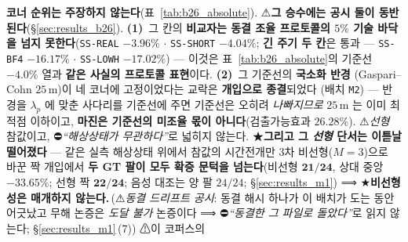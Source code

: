 \documentclass[11pt]{report}
\numberwithin{equation}{chapter}
\numberwithin{figure}{chapter}
\numberwithin{table}{chapter}
\newcommand{\MOneDrift}{\,(⚠\emph{동결 드리프트 공시}: 동결 해시 하나가 이 배치가 도는
동안 어긋났고 무해 논증은 \emph{도달 불가} 논증이다 ⟹ ⛔\emph{``동결한 그 파일로
돌았다''}로 읽지 않는다; \S\ref{sec:results_m1}\,(7))}
\begin{document}
\begin{itemize}
        \textbf{코너 순위는 주장하지 않는다}(표~\ref{tab:b26_absolute}).
        ⚠\textbf{그 승수에는 공시 둘이 동반된다}(\S\ref{sec:results_b26}).
        \textbf{(1)}~그 칸의 \textbf{비교자는 동결 조율 프로토콜의 $5\%$ 기술 바닥을 넘지
        못한다}(\texttt{SS-REAL} $-3.96\%$ $\cdot$ \texttt{SS-SHORT} $-4.04\%$;
        \textbf{긴 주기 두 칸}은 통과 --- \texttt{SS-BF4} $-16.17\%$ $\cdot$
        \texttt{SS-LOWH} $-17.02\%$) --- 이것은 표~\ref{tab:b26_absolute}의 기준선 $-4.0\%$ 열과
        \textbf{같은 사실의 프로토콜 표현}이다. \textbf{(2)}~그 기준선의 \textbf{국소화 반경}
        (Gaspari--Cohn $25$\,m)이 네 코너에 고정이었다는 교락은 \textbf{개입으로 종결}되었다
        (배치 \texttt{M2}) --- 반경을 $\lambda_p$ 에 맞춘 사다리를 기준선에 주면 기준선은 오히려
        \emph{나빠지므로} $25$\,m 는 이미 최적점 이하이고, \textbf{마진은 기준선의 미조율 몫이
        아니다}(검출가능효과 $26.28\%$).
        ⚠\emph{선형} 참값이고,
        ⛔\emph{``해상상태가 무관하다''}로 넓히지 않는다.
        ★\textbf{그리고 그 \emph{선형} 단서는 이튿날 떨어졌다} --- 같은 실측 해상상태
        위에서 참값의 시간전개만 $3$차 비선형($M{=}3$)으로 바꾼 짝 개입에서 \textbf{두
        GT 팔이 모두 확증 문턱을 넘는다}(비선형 $\mathbf{21/24}$, 상대 중앙
        $\mathbf{-33.65\%}$; 선형 짝 $\mathbf{22/24}$; 음성 대조는 양 팔 $24/24$;
        \S\ref{sec:results_m1}) ⟹ ★\textbf{비선형성은 매개하지 않는다.}\MOneDrift{} ⚠이 코퍼스의

\end{itemize}
\end{document}
